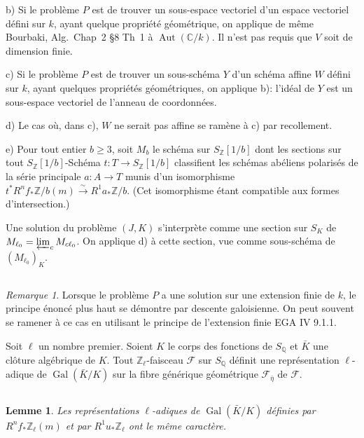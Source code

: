 \documentclass[10pt,leqno]{amsart}
\theoremstyle{plain}
\newtheorem{lemma}[theorem]{Lemme}
\theoremstyle{definition}
\theoremstyle{remark}
\newtheorem{remark}[theorem]{Remarque}
\DeclareMathOperator{\Gal}{Gal}
\DeclareMathOperator{\Aut}{Aut}
\newcommand{\ZZ}{\mathbb{Z}}
\newcommand{\QQ}{\mathbb{Q}}
\newcommand{\CC}{\mathbb{C}}
\begin{document}
b) Si le probl\`eme $P$ est de trouver un sous-espace vectoriel d'un espace vectoriel d\'efini sur $k$, ayant quelque propri\'et\'e g\'eom\'etrique, on applique de m\^eme Bourbaki, Alg.~Chap~2 \S8 Th~1 \`a $\Aut(\CC/k)$. Il n'est pas requis que $V$ soit de dimension finie.

c) Si le probl\`eme $P$ est de trouver un sous-sch\'ema $Y$ d'un sch\'ema affine $W$ d\'efini sur $k$, ayant quelques propri\'et\'es g\'eom\'etriques, on applique b): l'id\'eal de $Y$ est un sous-espace vectoriel de l'anneau de coordonn\'ees.

d) Le cas o\`u, dans c), $W$ ne serait pas affine se ram\`ene \`a c) par recollement.

e) Pour tout entier $b\ge 3$, soit $M_b$ le sch\'ema sur $S_\ZZ[1/b]$ dont les sections sur tout $S_\ZZ[1/b]$-Sch\'ema $t\colon T\to S_\ZZ[1/b]$ classifient les sch\'emas ab\'eliens polaris\'es de la s\'erie principale $a\colon A\to T$ munis d'un isomorphisme $t^*R^nf_*\ZZ/b(m)\xrightarrow{\sim}R^1a_*\ZZ/b$. (Cet isomorphisme \'etant compatible aux formes d'intersection.)

Une solution du probl\`eme $(J,K)$ s'interpr\`ete comme une section sur $S_K$ de $M_{\ell_0}=\varprojlim_c M_{c\ell_0}$. On applique d) \`a cette section, vue comme sous-sch\'ema de $(M_{\ell_0})_K$.

\subsection{}\label{2.4}

\begin{remark}
Lorsque le probl\`eme $P$ a une solution sur une extension finie de $k$, le principe \'enonc\'e plus haut se d\'emontre par descente galoisienne. On peut souvent se ramener \`a ce cas en utilisant le principe de l'extension finie EGA IV 9.1.1.
\end{remark}

Soit $\ell$ un nombre premier. Soient $K$ le corps des fonctions de $S_\QQ$ et $\bar{K}$ une cl\^oture alg\'ebrique de $K$. Tout $\ZZ_\ell$-faisceau $\mathscr{F}$ sur $S_\QQ$ d\'efinit une repr\'esentation $\ell$-adique de $\Gal(\bar{K}/K)$ sur la fibre g\'en\'erique g\'eom\'etrique $\mathscr{F}_{\bar{\eta}}$ de $\mathscr{F}$.

\subsection{}\label{2.5}

\begin{lemma}\label{lem:2.5}
Les repr\'esentations $\ell$-adiques de $\Gal(\bar{K}/K)$ d\'efinies par $R^nf_*\ZZ_\ell(m)$ et par $R^1u_*\ZZ_\ell$ ont le m\^eme caract\`ere.
\end{lemma}
\end{document}
